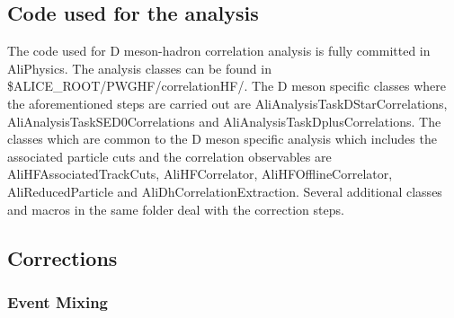 


\subsection{Code used for the analysis}
The code used for D meson-hadron correlation analysis is fully committed in AliPhysics. The analysis classes can be found in
\$ALICE\_ROOT/PWGHF/correlationHF/.  The  D meson specific classes where the aforementioned steps are carried out are
AliAnalysisTaskDStarCorrelations, AliAnalysisTaskSED0Correlations and AliAnalysisTaskDplusCorrelations. The classes which are common to the D meson specific analysis which includes the associated particle cuts and the correlation observables are AliHFAssociatedTrackCuts, AliHFCorrelator, AliHFOfflineCorrelator, AliReducedParticle and AliDhCorrelationExtraction. Several additional classes and macros in the same folder deal with the correction steps.


\subsection{Corrections}
\subsubsection{Event Mixing }


